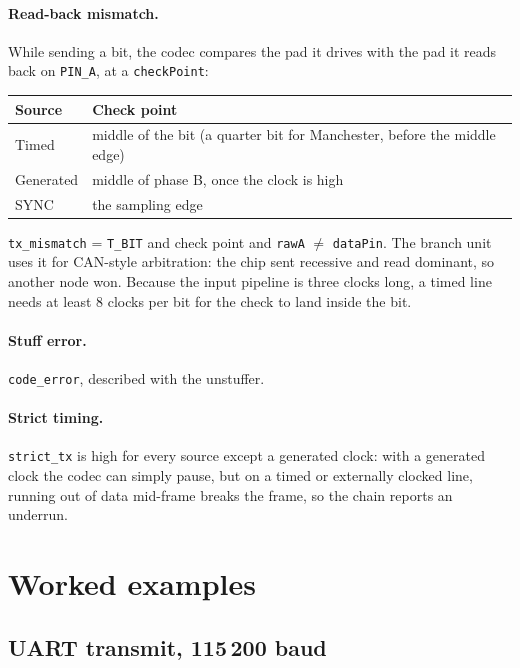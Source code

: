 \documentclass[11pt,a4paper]{article}
\newcommand{\sig}[1]{\texttt{#1}}
\begin{document}
\paragraph{Read-back mismatch.} While sending a bit, the codec compares the pad it drives with the pad it reads back on \sig{PIN\_A}, at a \sig{checkPoint}:

\begin{center}
\begin{tabularx}{\linewidth}{@{}l L@{}}
\toprule
Source & Check point \\
\midrule
Timed & middle of the bit (a quarter bit for Manchester, before the middle edge) \\
Generated & middle of phase B, once the clock is high \\
SYNC & the sampling edge \\
\bottomrule
\end{tabularx}
\end{center}

\sig{tx\_mismatch} = \sig{T\_BIT} and check point and \sig{rawA} $\ne$ \sig{dataPin}. The branch unit uses it for CAN-style arbitration: the chip sent recessive and read dominant, so another node won. Because the input pipeline is three clocks long, a timed line needs at least 8 clocks per bit for the check to land inside the bit.

\paragraph{Stuff error.} \sig{code\_error}, described with the unstuffer.

\paragraph{Strict timing.} \sig{strict\_tx} is high for every source except a generated clock: with a generated clock the codec can simply pause, but on a timed or externally clocked line, running out of data mid-frame breaks the frame, so the chain reports an underrun.

\section{Worked examples}

\subsection{UART transmit, 115\,200 baud}
\end{document}

